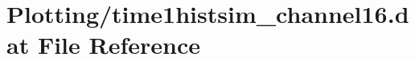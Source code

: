 \hypertarget{Plotting_2time1histsim__channel16_8dat}{}\section{Plotting/time1histsim\+\_\+channel16.dat File Reference}
\label{Plotting_2time1histsim__channel16_8dat}
